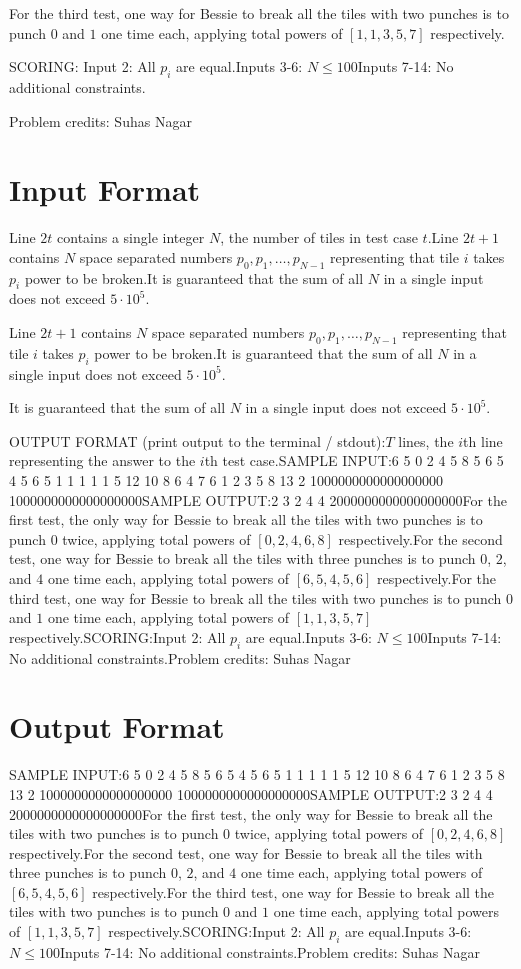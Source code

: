 \documentclass[12pt]{article}
\begin{document}
For the third test, one way for Bessie to break all the tiles with two punches
is to punch $0$ and $1$ one time each, applying total powers of $[1,1,3,5,7]$
respectively.

SCORING:
Input 2: All $p_i$ are equal.Inputs 3-6: $N\le 100$Inputs 7-14: No additional constraints.


Problem credits: Suhas Nagar



\section*{Input Format}
Line $2t$ contains a single integer $N$, the number of tiles in test case $t$.Line $2t+1$ contains $N$ space separated numbers $p_0,p_1, \ldots, p_{N-1}$ representing
that tile $i$ takes $p_i$ power to be broken.It is guaranteed that the sum of all $N$ in a single input does not exceed
$5\cdot 10^5$.

Line $2t+1$ contains $N$ space separated numbers $p_0,p_1, \ldots, p_{N-1}$ representing
that tile $i$ takes $p_i$ power to be broken.It is guaranteed that the sum of all $N$ in a single input does not exceed
$5\cdot 10^5$.

It is guaranteed that the sum of all $N$ in a single input does not exceed
$5\cdot 10^5$.

OUTPUT FORMAT (print output to the terminal / stdout):$T$ lines, the $i$th line representing the answer to the $i$th test case.SAMPLE INPUT:6
5
0 2 4 5 8
5
6 5 4 5 6
5
1 1 1 1 1
5
12 10 8 6 4
7
6 1 2 3 5 8 13
2
1000000000000000000 1000000000000000000SAMPLE OUTPUT:2
3
2
4
4
2000000000000000000For the first test, the only way for Bessie to break all the tiles with two
punches is to punch $0$ twice, applying total powers of $[0,2,4,6,8]$
respectively.For the second test, one way for Bessie to break all the tiles with three
punches is to punch $0$, $2$, and $4$ one time each, applying total powers of
$[6,5,4,5,6]$ respectively.For the third test, one way for Bessie to break all the tiles with two punches
is to punch $0$ and $1$ one time each, applying total powers of $[1,1,3,5,7]$
respectively.SCORING:Input 2: All $p_i$ are equal.Inputs 3-6: $N\le 100$Inputs 7-14: No additional constraints.Problem credits: Suhas Nagar

\section*{Output Format}
SAMPLE INPUT:6
5
0 2 4 5 8
5
6 5 4 5 6
5
1 1 1 1 1
5
12 10 8 6 4
7
6 1 2 3 5 8 13
2
1000000000000000000 1000000000000000000SAMPLE OUTPUT:2
3
2
4
4
2000000000000000000For the first test, the only way for Bessie to break all the tiles with two
punches is to punch $0$ twice, applying total powers of $[0,2,4,6,8]$
respectively.For the second test, one way for Bessie to break all the tiles with three
punches is to punch $0$, $2$, and $4$ one time each, applying total powers of
$[6,5,4,5,6]$ respectively.For the third test, one way for Bessie to break all the tiles with two punches
is to punch $0$ and $1$ one time each, applying total powers of $[1,1,3,5,7]$
respectively.SCORING:Input 2: All $p_i$ are equal.Inputs 3-6: $N\le 100$Inputs 7-14: No additional constraints.Problem credits: Suhas Nagar
\end{document}
